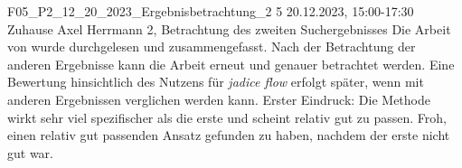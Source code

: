 \fieldnote
{F05\_P2\_12\_20\_2023\_Ergebnisbetrachtung\_2}
{5}
{20.12.2023, 15:00-17:30}
{Zuhause}
{Axel Herrmann}
{2, Betrachtung des zweiten Suchergebnisses}
{
	Die Arbeit von  wurde durchgelesen und zusammengefasst.
}
{
	Nach der Betrachtung der anderen Ergebnisse kann die Arbeit erneut und genauer betrachtet werden.
	Eine Bewertung hinsichtlich des Nutzens für \emph{jadice flow} erfolgt später, wenn mit anderen Ergebnissen verglichen werden kann.
}
{
  Erster Eindruck: Die Methode wirkt sehr viel spezifischer als die erste und scheint relativ gut zu passen.
}
{}
{
  Froh, einen relativ gut passenden Ansatz gefunden zu haben, nachdem der erste nicht gut war.
}
